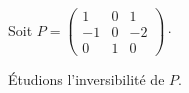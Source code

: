 \documentclass[french,11pt,twoside]{VcCours}
\begin{document}
\begin{Exemple} Soit $P = \begin{pmatrix}
        1&0&1\\-1&0&-2\\0&1&0
       \end{pmatrix} \cdot$
       
Étudions l'inversibilité de $P$. 

%

\end{Exemple}
\end{document}
